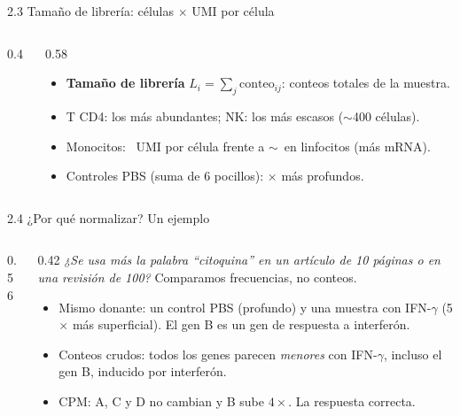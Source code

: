 \begin{frame}{2.3 Tamaño de librería: células $\times$ UMI por célula}
  \centering
  \\[-1pt]
  \begin{columns}[c]
    \begin{column}{0.4\linewidth}
      \centering\scriptsize
      
    \end{column}
    \begin{column}{0.58\linewidth}\footnotesize
      \begin{itemize}\setlength\itemsep{2pt}
        \item \textbf{Tamaño de librería} $L_i=\sum_j\text{conteo}_{ij}$: conteos totales de la muestra.
        \item T CD4: los más abundantes; NK: los más escasos ($\sim$400 células).
        \item Monocitos: \alert{\numumiMono\ UMI por célula} frente a $\sim$\numumiNK\ en linfocitos (más mRNA).
        \item Controles PBS (suma de 6 pocillos): \alert{\numpbsratio$\times$ más profundos}.
      \end{itemize}
    \end{column}
  \end{columns}
\end{frame}

\begin{frame}{2.4 ¿Por qué normalizar? Un ejemplo}
  \begin{columns}[c]
    \begin{column}{0.56\linewidth}
    \end{column}
    \begin{column}{0.42\linewidth}\small
      \textit{¿Se usa más la palabra ``citoquina'' en un artículo de 10 páginas o en una revisión de 100?} Comparamos \alert{frecuencias}, no conteos.
      \vspace{0.2cm}
      \begin{itemize}\setlength\itemsep{3pt}
        \item Mismo donante: un control PBS (profundo) y una muestra con IFN-$\gamma$ (5$\times$ más superficial). El gen B es un gen de respuesta a interferón.
        \item \alert{Conteos crudos}: todos los genes parecen \emph{menores} con IFN-$\gamma$, incluso el gen B, inducido por interferón.
        \item \alert{CPM}: A, C y D no cambian y B sube $4\times$. La respuesta correcta.
      \end{itemize}
    \end{column}
  \end{columns}
\end{frame}

